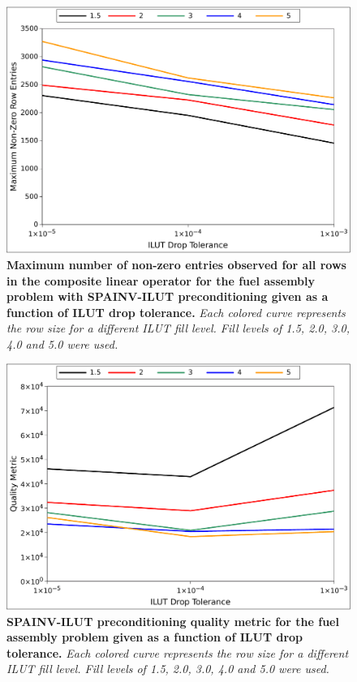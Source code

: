 \begin{figure}[t!]
  \begin{center}
    \includegraphics[width=6in]{chapters/spn_equations/psilut_size.pdf}
  \end{center}
  \caption{\textbf{Maximum number of non-zero entries observed for all
      rows in the composite linear operator for the fuel assembly
      problem with SPAINV-ILUT preconditioning given as a function of
      ILUT drop tolerance.} \textit{Each colored curve represents the
      row size for a different ILUT fill level. Fill levels of 1.5,
      2.0, 3.0, 4.0 and 5.0 were used.}}
 \label{fig:spainv_ilut_size}
\end{figure}

\begin{figure}[t!]
  \begin{center}
    \includegraphics[width=6in]{chapters/spn_equations/psilut_quality.pdf}
  \end{center}
  \caption{\textbf{SPAINV-ILUT preconditioning quality metric for the
      fuel assembly problem given as a function of ILUT drop
      tolerance.} \textit{Each colored curve represents the row size
      for a different ILUT fill level. Fill levels of 1.5, 2.0, 3.0,
      4.0 and 5.0 were used.}}
  \label{fig:spainv_ilut_quality}
\end{figure}

